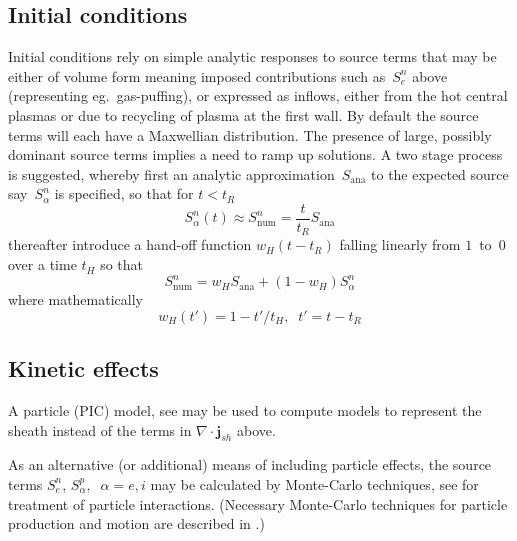 \subsection{Initial conditions}\label{sec:26init}
Initial conditions rely on simple analytic responses to source terms that may be either of
volume form meaning imposed contributions such as~$S^n_e$ above (representing eg.\ gas-puffing),
or expressed as inflows, either
from the hot central plasmas or due to recycling of plasma at the first wall.
By default the source terms will each have a Maxwellian distribution.
The presence of large, possibly dominant source terms implies a need to ramp up solutions.
A two stage process is suggested, whereby first an analytic approximation~$S_{\mathrm{ana}}$
to the expected source say~$S^n_\alpha$ is specified, so that for $t<t_R$
\begin{equation}
S^n_\alpha(t)\approx S^n_\mathrm{num}=\frac{t}{t_R} S_\mathrm{ana}
\end{equation}
thereafter introduce a hand-off function $w_H(t-t_R)$ falling linearly from $1$~to~$0$ 
over a time $t_H$ so that
\begin{equation}
S^n_\mathrm{num}=w_H S_\mathrm{ana} +\left(1-w_H\right)S^n_\alpha
\end{equation}
where mathematically
\begin{equation}
w_H (t')= 1-t'/t_H,\;\;t'=t-t_R
\end{equation}

\subsection{Kinetic effects}\label{sec:26kin}
A particle (PIC) model, see   may be used to compute models to represent the sheath instead of the 
terms in $\nabla\cdot\mathbf{j}_{sh}$ above.

As an alternative (or additional)  means of including particle effects, the source terms $S^n_e$,
$S^p_\alpha,\;\;\alpha=e,i$ may be calculated by Monte-Carlo techniques, see 
for treatment of particle interactions.
(Necessary Monte-Carlo techniques for particle production and motion
are described in .)

